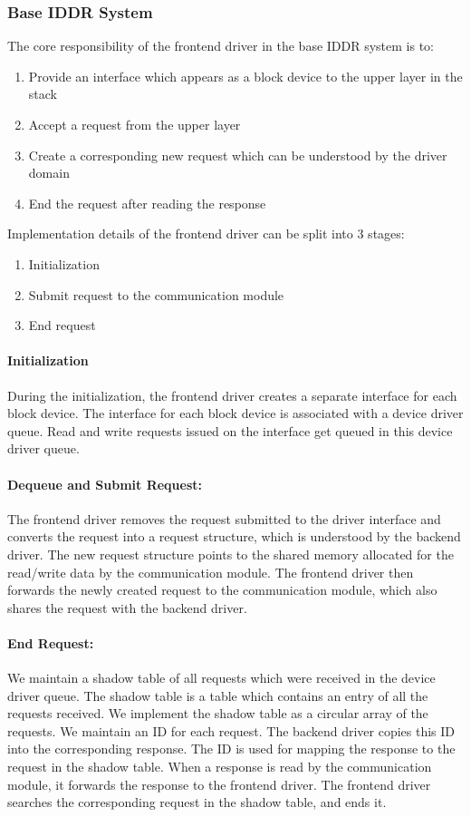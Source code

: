 \subsubsection*{Base IDDR System}
The core responsibility of the frontend driver in the base IDDR system is to:
\begin{enumerate}
\item Provide an interface which appears as a block device to the upper layer in the stack
\item Accept a request from the upper layer
\item Create a corresponding new request which can be understood by the driver domain
\item End the request after reading the response
\end{enumerate}

Implementation details of the frontend driver can be split into 3 stages: 
\begin{enumerate}
\item Initialization
\item Submit request to the communication module
\item End request
\end{enumerate}

\paragraph{Initialization}
During the initialization, the frontend driver creates a separate interface for each block device. The interface for each block device is associated with a device driver queue. Read and write requests issued on the interface get queued in this device driver queue.

\paragraph{Dequeue and Submit Request:}
The frontend driver removes the request submitted to the driver interface and converts the request into a request structure, which is understood by the backend driver. The new request structure points to the shared memory allocated for the read/write data by the communication module. The frontend driver then forwards the newly created request to the communication module, which also shares the request with the backend driver.

\paragraph{End Request:}
We maintain a shadow table of all requests which were received in the device driver queue. The shadow table is a table which contains an entry of all the requests received. We implement the shadow table as a circular array of the requests. We maintain an ID for each request. The backend driver copies this ID into the corresponding response. The ID is used for mapping the response to the request in the shadow table. When a response is read by the communication module, it forwards the response to the frontend driver. The frontend driver searches the corresponding request in the shadow table, and ends it. 

